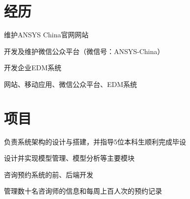 \documentclass[]{resume_zh}
\begin{document}
\begin{minipage}[t]{0.69\textwidth} 


\section{经历}
\vspace{\topsep} %
\begin{tightemize}
\item 维护ANSYS China官网网站
\item 开发及维护微信公众平台（微信号：ANSYS-China）
\item 开发企业EDM系统
\end{tightemize}
\sectionsep

\begin{tightemize}
\item 网站、移动应用、微信公众平台、EDM系统
\end{tightemize}



\section{项目}
\begin{tightemize}
\item 负责系统架构的设计与搭建，并指导5位本科生顺利完成毕设
\item 设计并实现模型管理、模型分析等主要模块
\end{tightemize}
\sectionsep


\begin{tightemize}
\item 咨询预约系统的前、后端开发
\item 管理数十名咨询师的信息和每周上百人次的预约记录
\end{tightemize}
\sectionsep


\end{minipage}
\end{document}
